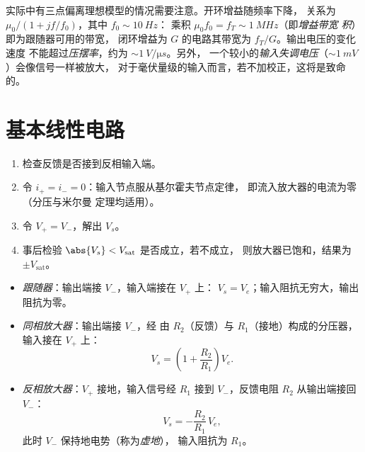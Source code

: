 \begin{remark}[实际放大器]\label{rem:b1:operational-amplifier:real}
实际中有三点偏离理想模型的情况需要注意。开环增益随频率下降，
关系为 $\mu_0/(1 + jf/f_0)$，其中 $f_0 \sim \qty{10}{Hz}$：
乘积 $\mu_0 f_0 = f_T \sim \qty{1}{MHz}$（即\emph{增益带宽
积}）即为跟随器可用的带宽，
闭环增益为 $G$ 的电路其带宽为 $f_T/G$。输出电压的变化速度
不能超过\emph{压摆率}，约为 $\sim\qty{1}{V/\micro s}$。另外，
一个较小的\emph{输入失调电压}（$\sim\qty{1}{mV}$）会像信号一样被放大，
对于毫伏量级的输入而言，若不加校正，这将是致命的。
\end{remark}

\section{基本线性电路}

\begin{method}[线性区中理想运算放大器电路的分析]\label{met:b1:operational-amplifier:method}
\begin{enumerate}
  \item 检查反馈是否接到反相输入端。
  \item 令 $i_+ = i_- = 0$：输入节点服从基尔霍夫节点定律，
        即流入放大器的电流为零（分压与米尔曼
        定理均适用）。
  \item 令 $V_+ = V_-$，解出 $V_s$。
  \item 事后检验 $\abs{V_s} < V_{\mathrm{sat}}$ 是否成立，若不成立，
        则放大器已饱和，结果为 $\pm V_{\mathrm{sat}}$。
\end{enumerate}
\end{method}

\begin{proposition}\label{prop:b1:operational-amplifier:basic}
\begin{itemize}
  \item \emph{跟随器}：输出端接 $V_-$，输入端接在 $V_+$ 上：
        $V_s = V_e$；输入阻抗无穷大，输出阻抗为零。
  \item \emph{同相放大器}：输出端接 $V_-$，经
        由 $R_2$（反馈）与 $R_1$（接地）构成的分压器，输入接在 $V_+$ 上：
        \[
        V_s = \left(1 + \frac{R_2}{R_1}\right)V_e .
        \]
  \item \emph{反相放大器}：$V_+$ 接地，输入信号经
        $R_1$ 接到 $V_-$，反馈电阻 $R_2$ 从输出端接回 $V_-$：
        \[
        V_s = -\frac{R_2}{R_1}\,V_e ,
        \]
        此时 $V_-$ 保持地电势（称为\emph{虚地}），
        输入阻抗为 $R_1$。
\end{itemize}
\end{proposition}

